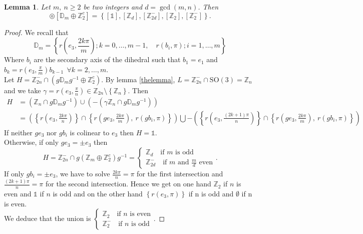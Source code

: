 \documentclass[11pt,a4paper]{amsart}
\newtheorem{lem}[thm]{Lemma}
\theoremstyle{definition}
\newcommand{\ZZ}{\mathbb{Z}}                %
\newcommand{\SO}{\mathrm{SO}}               %
\newcommand{\DD}{\mathbb{D}}                %
\newcommand{\1}{\mathds{1}}		            %
\newcommand{\set}[1]{\left\{#1\right\}}     %
\begin{document}
\begin{lem}
Let $m,\ n \geq 2$ be two integers and $d=\gcd(m,n)$. Then
\begin{equation*}
[\ZZ_{2n}^{-}] \circledcirc [\DD_m \oplus \ZZ_2^c]=\set{[\1],[\ZZ_d],[\ZZ_{2d}^-],[\ZZ_2],[\ZZ_2^-]}.
\end{equation*}
\end{lem}
\begin{proof}
We recall that
\begin{equation*}
\DD_m=\set{r(e_3,\frac{2k\pi}{m});k=0,\dotsc, m-1,\quad r(b_i,\pi); i=1,\dotsc,m}
\end{equation*}
Where $b_i$ are the secondary axis of the dihedral such that $b_1=e_1$ and $b_k=r(e_3,\frac{\pi}{m})b_{k-1}\ \ \forall k =2,\dotsc,m$.\\
Let $H=\ZZ_{2n}^- \cap (g\DD_m g^{-1}\oplus \ZZ_2^c)$.
By lemma \ref{thelemma}, $L=\ZZ_{2n}^-\cap \SO(3)=\ZZ_n$ and we take $\gamma=r(e_3,\frac{\pi}{n})\in \ZZ_{2n}\setminus\set{\ZZ_n}$. Then
\begin{align*}
H&=(\ZZ_n\cap g \DD_m g^{-1})\cup (-(\gamma\ZZ_n\cap g \DD_m g^{-1}))\\
 &=\left(\set{r(e_3,\frac{2k\pi}{n})}\cap \set{r(ge_3,\frac{2k\pi}{m}),\ r(gb_i,\pi)}\right)\bigcup
 -\left(\set{r(e_3,\frac{(2k+1)\pi}{n})}\cap \set{r(ge_3,\frac{2k\pi}{m}),\ r(gb_i,\pi)}\right)
\end{align*}
If neither $ge_3$ nor $gb_i$ is colinear to $e_3$ then $H=\1$.\\
Otherwise, if only $ge_3=\pm e_3$ then
\begin{equation*}
H=\ZZ_{2n}^{-} \cap g(\ZZ_m \oplus \ZZ_2^c)g^{-1}=
\begin{cases}
\ZZ_d\quad \text{if $m$ is odd} \\
\ZZ_{2d}^- \quad \text{if $m$ and $\frac{m}{d}$ even}
\end{cases}.
\end{equation*}
If only $gb_i=\pm e_3$, we have to solve $\displaystyle \frac{2k\pi}{n}=\pi$ for the first intersection and $\displaystyle \frac{(2k+1)\pi}{n}=\pi$ for the second intersection. Hence we get on one hand $\ZZ_2$ if $n$ is even and $\1$ if $n$ is odd and on the other hand $\set{r(e_3,\pi)}$ if n is odd and $\emptyset$ if n is even. \\We deduce that the union is
$
\begin{cases}
\ZZ_2 \quad \text{if $n$ is even}\\
\ZZ_2^{-} \quad \text{if $n$ is odd}
\end{cases}.$
\end{proof}
\end{document}
